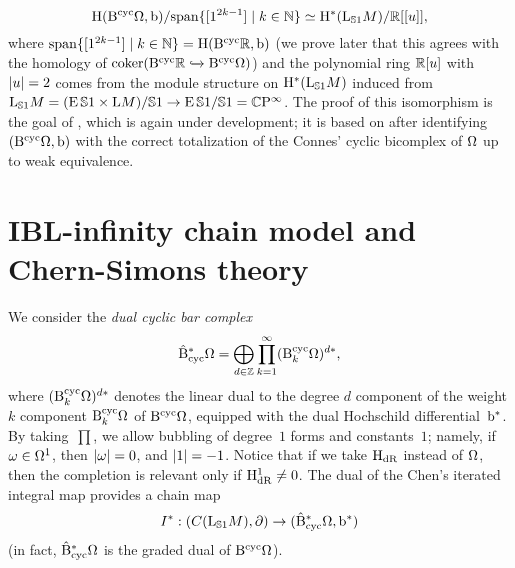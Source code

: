 \documentclass[\MainFolder/Text.tex]{subfiles}
\begin{document}
\begin{equation}\label{Eq:IsomKai}
\mathrm{H}(\mathrm{B}^{\mathrm{cyc}} \Omega,\mathrm{b})/\mathrm{span}\{[1^{2k-1}]\mid k\in\mathbb{N}\} \simeq \mathrm{H}^*(\mathrm{L}_{\mathbb{S}{1}} M)/\mathbb{R}[[u]],
\end{equation}
where $\mathrm{span}\{[1^{2k-1}]\mid k\in\mathbb{N}\} = \mathrm{H}(\mathrm{B}^{\mathrm{cyc}} \mathbb{R},\mathrm{b})$ (we prove later that this agrees with the homology of $\operatorname{\mathrm{coker}}(\mathrm{B}^{\mathrm{cyc}} \mathbb{R} \xhookrightarrow{} \mathrm{B}^{\mathrm{cyc}} \Omega)$) and the polynomial ring $\mathbb{R}[u]$ with $|u| = 2$ comes from the module structure on $\mathrm{H}^*(\mathrm{L}_{\mathbb{S}{1}} M)$ induced from $\mathrm{L}_{\mathbb{S}{1}} M = (\operatorname{E} \mathbb{S}{1} \times \mathrm{L} M)/\mathbb{S}{1} \rightarrow \operatorname{E}\mathbb{S}{1}/\mathbb{S}{1} = \mathbb{C}\mathrm{P}^{\infty}$. The proof of this isomorphism is the goal of \cite{Cieliebak2018b}, which is again under development; it is based on \cite{Getzler} after identifying $(\mathrm{B}^{\mathrm{cyc}} \Omega,\mathrm{b})$ with the correct totalization of the Connes' cyclic bicomplex of $\Omega$ up to weak equivalence.

\section{IBL-infinity chain model and Chern-Simons theory}

We consider the \emph{dual cyclic bar complex}
\[ \hat{\mathrm{B}}_{\mathrm{cyc}}^* \Omega = \bigoplus_{d\in\mathbb{Z}} \prod_{k=1}^\infty (\mathrm{B}^{\mathrm{cyc}}_k \Omega)^{d*}, \]
where $(\mathrm{B}^{\mathrm{cyc}}_k \Omega)^{d*}$ denotes the linear dual to the degree $d$ component of the weight $k$ component $\mathrm{B}^{\mathrm{cyc}}_k \Omega$ of $\mathrm{B}^{\mathrm{cyc}} \Omega$, equipped with the dual Hochschild differential~$\mathrm{b}^*$. By taking~$\prod$, we allow bubbling of degree~$1$ forms and constants~$1$; namely, if $\omega\in \Omega^1$, then $|\omega| = 0$, and $|1| = -1$. Notice that if we take $\mathrm{H}_{\mathrm{dR}}$ instead of $\Omega$, then the completion is relevant only if $\mathrm{H}_{\mathrm{dR}}^1 \neq 0$. The dual of the Chen's iterated integral map provides a chain map 
\[I^*: (C(\mathrm{L}_{\mathbb{S}{1}} M),\partial) \rightarrow (\hat{\mathrm{B}}_{\mathrm{cyc}}^*\Omega,\mathrm{b}^*) \]
(in fact, $ \hat{\mathrm{B}}_{\mathrm{cyc}}^* \Omega$ is the graded dual of $\mathrm{B}^{\mathrm{cyc}} \Omega$).
\end{document}
